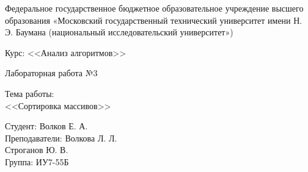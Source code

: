 \documentclass[a4paper,12pt]{article}
\begin{document}



\large
\begin{center}
Федеральное государственное бюджетное образовательное учреждение высшего образования «Московский государственный технический университет имени Н. Э. Баумана (национальный исследовательский университет»)
\end{center}

\vspace*{30mm} 

\LARGE
\begin{center}
Курс: <<Анализ алгоритмов>>

Лабораторная работа №3
\end{center}

\vspace*{30mm} 

\huge
\begin{center}
Тема работы:\\
<<Сортировка массивов>>
\end{center}
\vspace*{30mm} 

\large
\begin{flushright}
Студент: Волков Е. А. \\
Преподаватели: Волкова Л. Л. \\
				Строганов Ю. В. \\
Группа: ИУ7-55Б
\end{flushright}
\end{document}
